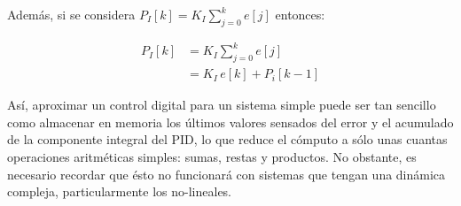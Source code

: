 Además, si se considera $P_{I}[k] = K_{I}\sum^{k}_{j=0} e[j]$ entonces:

\begin{align*}
P_{I}[k]
	&= K_{I}\sum^{k}_{j=0} e[j]\\
	&= K_{I}\,e[k] + P_{i}[k-1]
\end{align*}

Así, aproximar un control digital para un sistema simple puede ser tan sencillo como almacenar en memoria los últimos valores sensados del error y el acumulado de la componente integral del PID, lo que reduce el cómputo a sólo unas cuantas operaciones aritméticas simples: sumas, restas y productos.
No obstante, es necesario recordar que ésto no funcionará con sistemas que tengan una dinámica compleja, particularmente los no-lineales.

